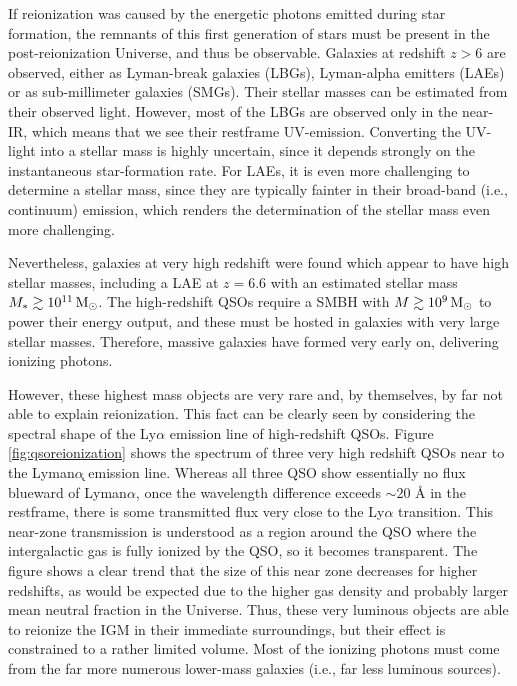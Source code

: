 \documentclass[a4paper,11pt]{article}
\begin{document}
{\noindent}If reionization was caused by the energetic photons emitted during star formation, the remnants of this first generation of stars must be present in the post-reionization Universe, and thus be observable. Galaxies at redshift $z>6$ are observed, either as Lyman-break galaxies (LBGs), Lyman-alpha emitters (LAEs) or as sub-millimeter galaxies (SMGs). Their stellar masses can be estimated from their observed light. However, most of the LBGs are observed only in the near-IR, which means that we see their restframe UV-emission. Converting the UV-light into a stellar mass is highly uncertain, since it depends strongly on the instantaneous star-formation rate. For LAEs, it is even more challenging to determine a stellar mass, since they are typically fainter in their broad-band (i.e., continuum) emission, which renders the determination of the stellar mass even more challenging.

{\noindent}Nevertheless, galaxies at very high redshift were found which appear to have high stellar masses, including a LAE at $z=6.6$ with an estimated stellar mass $M_*\gtrsim10^{11}\,{\rm M_\odot}$. The high-redshift QSOs require a SMBH with $M\gtrsim10^9\,{\rm M_\odot}$ to power their energy output, and these must be hosted in galaxies with very large stellar masses. Therefore, massive galaxies have formed very early on, delivering ionizing photons.

{\noindent}However, these highest mass objects are very rare and, by themselves, by far not able to explain reionization. This fact can be clearly seen by considering the spectral shape of the Ly$\alpha$ emission line of high-redshift QSOs. Figure \ref{fig:qsoreionization} shows the spectrum of three very high redshift QSOs near to the Lyman$\alpha$̨ emission line. Whereas all three QSO show essentially no flux blueward of Lyman$\alpha$, once the wavelength difference exceeds $\sim20$ {\AA} in the restframe, there is some transmitted flux very close to the Ly$\alpha$ transition. This near-zone transmission is understood as a region around the QSO where the intergalactic gas is fully ionized by the QSO, so it becomes transparent. The figure shows a clear trend that the size of this near zone decreases for higher redshifts, as would be expected due to the higher gas density and probably larger mean neutral fraction in the Universe. Thus, these very luminous objects are able to reionize the IGM in their immediate surroundings, but their effect is constrained to a rather limited volume. Most of the ionizing photons must come from the far more numerous lower-mass galaxies (i.e., far less luminous sources).
\end{document}
